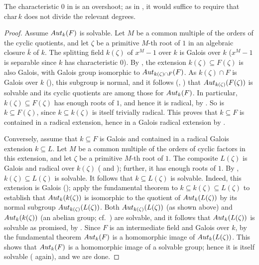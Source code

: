 The characteristic $0$ in  is an overshoot; as
in , it would suffice to require that
$\mathrm{char}\,k$ does not divide the relevant degrees.
\begin{proof}
  Assume $Aut_k(F)$ is solvable. Let $M$ be a common multiple of the
  orders of the cyclic quotients, and let $\zeta$ be a primitive
  $M$-th root of $1$ in an algebraic closure $\bar{k}$ of $k$. The
  splitting field $k(\zeta)$ of $x^M - 1$ over $k$ is Galois over $k$
  ($x^M - 1$ is separable since $k$ has characteristic $0$). By
  , the extension $k(\zeta) \subseteq F(\zeta)$
  is also Galois, with Galois group isomorphic to
  $Aut_{k(\zeta) \cap F}(F)$. As $k(\zeta) \cap F$ is Galois over $k$
  (), this subgroup is normal, and
  it follows (, ) that
  $Aut_{k(\zeta)}(F(\zeta))$ is solvable and its cyclic quotients are
  among those for $Aut_k(F)$. In particular,
  $k(\zeta) \subseteq F(\zeta)$ has enough roots of $1$, and hence it
  is radical, by . So is
  $k \subseteq F(\zeta)$, since $k \subseteq k(\zeta)$ is itself
  trivially radical. This proves that $k \subseteq F$ is contained in
  a radical extension, hence in a Galois radical extension by
  .

  Conversely, assume that $k \subseteq F$ is Galois and contained in a
  radical Galois extension $k \subseteq L$. Let $M$ be a common
  multiple of the orders of cyclic factors in this extension, and let
  $\zeta$ be a primitive $M$-th root of $1$. The composite $L(\zeta)$
  is Galois and radical over $k(\zeta)$ ( and
  ); further,
  it has enough roots of $1$. By ,
  $k(\zeta) \subseteq L(\zeta)$ is solvable. It follows that
  $k \subseteq L(\zeta)$ is solvable. Indeed, this extension is Galois
  ();
  apply the fundamental theorem to
  $k \subseteq k(\zeta) \subseteq L(\zeta)$ to establish that
  $Aut_k(k(\zeta))$ is isomorphic to the quotient of
  $Aut_k(L(\zeta))$ by its normal subgroup
  $Aut_{k(\zeta)}(L(\zeta))$. Both $Aut_{k(\zeta)}(L(\zeta))$ (as
  shown above) and $Aut_k(k(\zeta))$ (an abelian group; cf.\
  ) are solvable, and it follows that
  $Aut_k(L(\zeta))$ is solvable as promised, by
  . Since $F$ is an intermediate
  field and Galois over $k$, by the fundamental theorem $Aut_k(F)$ is
  a homomorphic image of $Aut_k(L(\zeta))$. This shows that
  $Aut_k(F)$ is a homomorphic image of a solvable group; hence it is
  itself solvable (\Cref{coro:groups2:solvable-normal} again), and we
  are done.
\end{proof}
